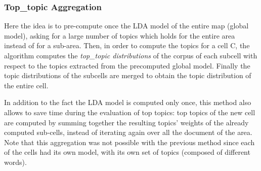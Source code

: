 	\subsubsection{Top\_topic Aggregation}
	
	Here the idea is to pre-compute once the LDA model of the entire map (global model), asking for a large number of topics which holds for the entire area instead of for a sub-area. Then, in order to compute the topics for a cell C, the algorithm computes the \emph{top\_topic distributions} of the corpus of each subcell with respect to the topics extracted from the precomputed global model. Finally the topic distributions of the subcells are merged to obtain the topic distribution of the entire cell.\\

	\begin{algorithm}

    
    \end{algorithm}
    
In addition to the fact the LDA model is computed only once, this method also allows to save time during the evaluation of top topics: top topics of the new cell are computed by summing together the resulting topics' weights of the already computed sub-cells, instead of iterating again over all the document of the area. Note that this aggregation was not possible with the previous method since each of the cells had its own model, with its own set of topics (composed of different words).

